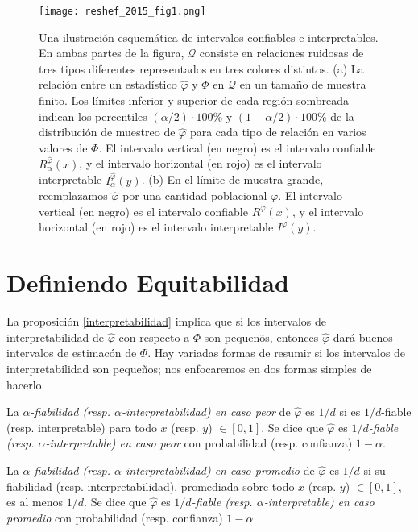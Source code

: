 	\begin{figure}[H] 
		\centering
		\texttt{[image: reshef\_2015\_fig1.png]}
		\caption{
			\label{reshef_2015_f1}
			Una ilustraci\'on esquem\'atica de intervalos confiables e interpretables. En ambas partes de la figura, $\mathcal{Q}$ consiste en relaciones ruidosas de tres tipos diferentes representados en tres colores distintos. (a) La relaci\'on entre un estad\'istico $\hat{\varphi}$ y $\Phi$ en $\mathcal{Q}$ en un tama\~no de muestra finito. Los l\'imites inferior y superior de cada regi\'on sombreada indican los percentiles $(\alpha / 2) \cdot 100 \%$ y $(1 - \alpha / 2) \cdot 100 \%$ de la distribuci\'on de muestreo de $\hat{\varphi}$ para cada tipo de relaci\'on en varios valores de $\Phi$. El intervalo vertical (en negro) es el intervalo confiable $R_\alpha^{\hat{\varphi}}(x)$, y el intervalo horizontal (en rojo) es el intervalo interpretable $I_\alpha^{\hat{\varphi}}(y)$. (b) En el l\'imite de muestra grande, reemplazamos $\hat{\varphi}$ por una cantidad poblacional $\varphi$. El intervalo vertical (en negro) es el intervalo confiable $R^{\varphi}(x)$, y el intervalo horizontal (en rojo) es el intervalo interpretable $I^{\varphi}(y)$.}
	\end{figure}

	\section{Definiendo Equitabilidad}

	La proposici\'on \ref{interpretabilidad} implica que si los intervalos de interpretabilidad de $\hat{\varphi}$ con respecto a $\Phi$ son pequen\~os, entonces $\hat{\varphi}$ dar\'a buenos intervalos de estimac\'on de $\Phi$. Hay variadas formas de resumir si los intervalos de interpretabilidad son peque\~nos; nos enfocaremos en dos formas simples de hacerlo.
	
	\begin{defn}
		La \textit{$\alpha$-fiabilidad (resp. $\alpha$-interpretabilidad) en caso peor} de $\hat{\varphi}$ es $1/d$ si es $1/d$-fiable (resp. interpretable) para todo $x$ (resp. $y$) $\in [0,1]$. Se dice que $\hat{\varphi}$ es \textit{$1/d$-fiable (resp. $\alpha$-interpretable) en caso peor} con probabilidad (resp. confianza) $1-\alpha$.

		La \textit{$\alpha$-fiabilidad (resp. $\alpha$-interpretabilidad) en caso promedio} de $\hat{\varphi}$ es $1/d$ si su fiabilidad (resp. interpretabilidad), promediada sobre todo $x$ (resp. $y$) $\in [0,1]$, es al menos $1/d$. Se dice que $\hat{\varphi}$ es \textit{$1/d$-fiable (resp. $\alpha$-interpretable) en caso promedio} con probabilidad (resp. confianza) $1-\alpha$
	\end{defn}

